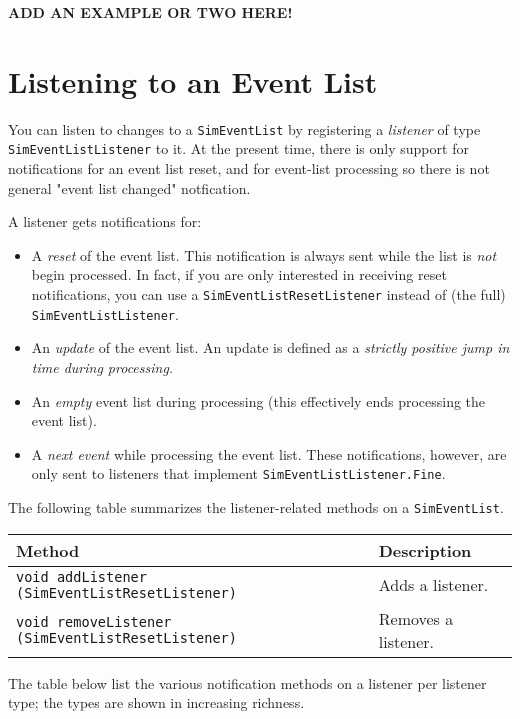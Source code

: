 \documentclass[12pt]{book}
\begin{document}
{\bf ADD AN EXAMPLE OR TWO HERE!}

\section{Listening to an Event List}

You can listen to changes to a \lstinline{SimEventList} by registering
  a {\em listener\/} of type \lstinline{SimEventListListener} to it.
At the present time,
  there is only support for notifications
  for an event list reset,
  and for event-list processing
  so there is not general "event list changed" notfication.

A listener gets notifications for:
\begin{itemize}
\item A {\em reset\/} of the event list.
      This notification is always sent while the list is {\em not\/} begin processed.
      In fact, if you are only interested in receiving
      reset notifications, you can use a \lstinline|SimEventListResetListener| instead
      of (the full) \lstinline|SimEventListListener|.
\item An {\em update\/} of the event list.
      An update is defined as a {\em strictly positive jump in time during processing.}
\item An {\em empty\/}  event list during processing (this effectively ends processing the event list).
\item A {\em next event\/} while processing the event list.
      These notifications, however, are only sent to listeners that implement
      \lstinline|SimEventListListener.Fine|.
\end{itemize}

The following table summarizes the listener-related methods on a \lstinline-SimEventList-.

\begin{tabular}{|l|l|}
  \hline
  {\bf Method} & {\bf Description} \\
  \hline
  \lstinline[basicstyle=\footnotesize]!void addListener (SimEventListResetListener)!
    & Adds a listener. \\
  \lstinline[basicstyle=\footnotesize]!void removeListener (SimEventListResetListener)!
    & Removes a listener. \\
  \hline
\end{tabular}

The table below list the various notification methods on a listener
  per listener type; the types are shown in increasing richness.
\end{document}
